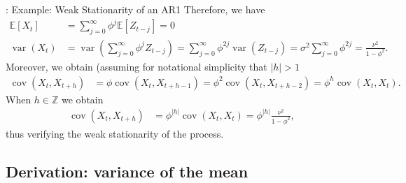 \documentclass[envcountsect,usenames,dvipsnames]{beamer}
\DeclareMathOperator*{\cov}{cov}
\DeclareMathOperator*{\var}{var}
\theoremstyle{mystyle}
\begin{document}
\begin{frame}{\thesubsection: Example: Weak Stationarity of an AR1}
\small
Therefore, we have
%
\begin{equation*}
    \begin{aligned}
           \mathbb{E}\left[X_t\right] &=  \sum\limits_{j = 0}^{\infty} {{\phi ^j}{\mathbb{E} [Z_{t - j}]}} = 0\\
           \var\left(X_t\right) &= \var\left(\sum\limits_{j = 0}^{\infty} {{\phi ^j}{Z_{t - j}}}\right) = \sum\limits_{j = 0}^{\infty} {\phi^{2j}} \var\left(Z_{t-j}\right) = \sigma^2 \sum\limits_{j = 0}^{\infty} {\phi^{2j}} = \frac{\nu^2}{1-\phi^2}.
    \end{aligned}
\end{equation*}
%
Moreover, we obtain (assuming for notational simplicity that $|h| > 1$
%
\begin{equation*}
    \begin{aligned}
           \cov\left(X_t, X_{t+h}\right) &= \phi \cov\left(X_t, X_{t+h-1}\right) = \phi^2 \cov\left(X_t, X_{t+h-2}\right) = \phi^h \cov(X_t, X_t).
    \end{aligned}
\end{equation*}
%
When $h \in \mathbb{Z}$ we obtain
%
\begin{equation*}
    \begin{aligned}
           \cov\left(X_t, X_{t+h}\right) & = \phi^{|h|} \cov(X_t, X_t) = \phi^{|h|} \frac{\nu^2}{1-\phi^2},
    \end{aligned}
\end{equation*}
%
thus verifying the weak stationarity of the process.

\hyperlink{rem:verif}{}
\end{frame}


\subsection{Derivation: variance of the mean}
\label{app:deriv:var:bar}
\end{document}
